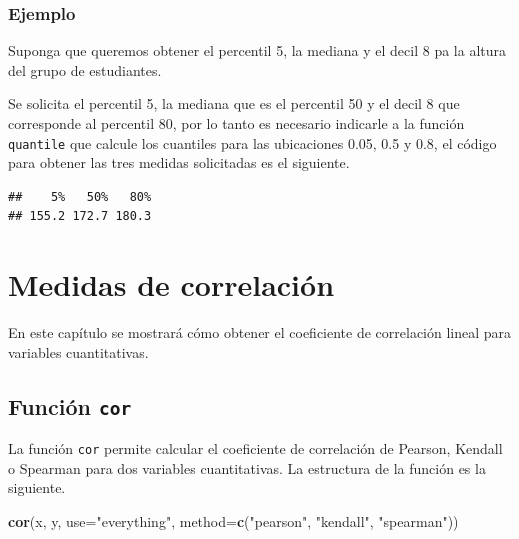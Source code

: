 \documentclass[10pt,]{krantz}
\makeatletter
\newenvironment{Shaded}{\begin{snugshade}}{\end{snugshade}}
\newcommand{\KeywordTok}[1]{\textcolor[rgb]{0.13,0.29,0.53}{\textbf{#1}}}
\newcommand{\DataTypeTok}[1]{\textcolor[rgb]{0.13,0.29,0.53}{#1}}
\newcommand{\FloatTok}[1]{\textcolor[rgb]{0.00,0.00,0.81}{#1}}
\newcommand{\StringTok}[1]{\textcolor[rgb]{0.31,0.60,0.02}{#1}}
\newcommand{\OperatorTok}[1]{\textcolor[rgb]{0.81,0.36,0.00}{\textbf{#1}}}
\newcommand{\NormalTok}[1]{#1}
\newenvironment{kframe}{%
\medskip{}
\setlength{\fboxsep}{.8em}
 \def\at@end@of@kframe{}%
 \ifinner\ifhmode%
  \def\at@end@of@kframe{\end{minipage}}%
  \begin{minipage}{\columnwidth}%
 \fi\fi%
 \def\FrameCommand##1{\hskip\@totalleftmargin \hskip-\fboxsep
 \colorbox{shadecolor}{##1}\hskip-\fboxsep
     \hskip-\linewidth \hskip-\@totalleftmargin \hskip\columnwidth}%
 \MakeFramed {\advance\hsize-\width
   \@totalleftmargin\z@ \linewidth\hsize
   \@setminipage}}%
 {\par\unskip\endMakeFramed%
 \at@end@of@kframe}
\renewenvironment{Shaded}{\begin{kframe}}{\end{kframe}}
\makeatother
\begin{document}
\subsection*{Ejemplo}\label{ejemplo-42}


Suponga que queremos obtener el percentil 5, la mediana y el decil 8 pa
la altura del grupo de estudiantes.

Se solicita el percentil 5, la mediana que es el percentil 50 y el decil
8 que corresponde al percentil 80, por lo tanto es necesario indicarle a
la función \texttt{quantile} que calcule los cuantiles para las
ubicaciones 0.05, 0.5 y 0.8, el código para obtener las tres medidas
solicitadas es el siguiente.

\begin{Shaded}
\end{Shaded}

\begin{verbatim}
##    5%   50%   80% 
## 155.2 172.7 180.3
\end{verbatim}

\chapter{Medidas de correlación}\label{correl}

En este capítulo se mostrará cómo obtener el coeficiente de correlación
lineal para variables cuantitativas.

\section{\texorpdfstring{Función \texttt{cor} 
}{Función cor  }}\label{funcion-cor}

La función \texttt{cor} permite calcular el coeficiente de correlación
de Pearson, Kendall o Spearman para dos variables cuantitativas. La
estructura de la función es la siguiente.

\begin{Shaded}
\begin{Highlighting}[]
\KeywordTok{cor}\NormalTok{(x, y, }\DataTypeTok{use=}\StringTok{"everything"}\NormalTok{,}
    \DataTypeTok{method=}\KeywordTok{c}\NormalTok{(}\StringTok{"pearson"}\NormalTok{, }\StringTok{"kendall"}\NormalTok{, }\StringTok{"spearman"}\NormalTok{))}
\end{Highlighting}
\end{Shaded}
\end{document}
